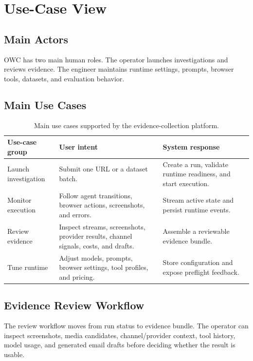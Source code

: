 \section{Use-Case View}

\subsection{Main Actors}

OWC has two main human roles. The operator launches investigations and reviews
evidence. The engineer maintains runtime settings, prompts, browser tools,
datasets, and evaluation behavior.

\subsection{Main Use Cases}



\begin{table}[!htbp]
\centering
\begin{tabularx}{\textwidth}{Q{3.2cm} Y Y}
\toprule
{}
Use-case group & User intent & System response \\
\midrule
Launch investigation & Submit one URL or a dataset batch. & Create a run,
validate runtime readiness, and start execution. \\
Monitor execution & Follow agent transitions, browser actions, screenshots,
and errors. & Stream active state and persist runtime events. \\
Review evidence & Inspect streams, screenshots, provider results, channel
signals, costs, and drafts. & Assemble a reviewable evidence bundle. \\
Tune runtime & Adjust models, prompts, browser settings, tool profiles, and
pricing. & Store configuration and expose preflight feedback. \\
\bottomrule
\end{tabularx}
\caption{Main use cases supported by the evidence-collection platform.}
\label{tab:architecture-actors}
\end{table}

\subsection{Evidence Review Workflow}

The review workflow moves from run status to evidence bundle. The operator can
inspect screenshots, media candidates, channel/provider context, tool history,
model usage, and generated email drafts before deciding whether the result is
usable.

